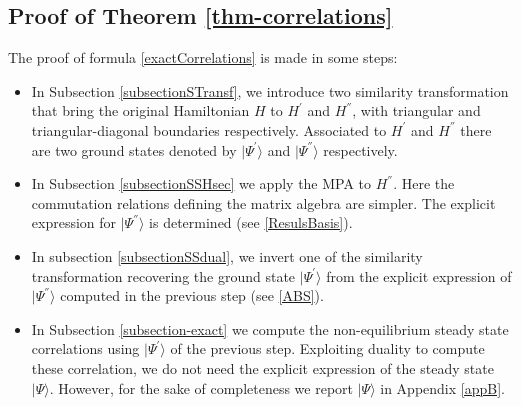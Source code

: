 \documentclass[10pt]{article}
\numberwithin{equation}{section}
\numberwithin{equation}{subsection}
\begin{document}
\subsection{Proof of Theorem \ref{thm-correlations}}
The proof of formula \eqref{exactCorrelations} is made in some steps:
\begin{itemize}
	\item In Subsection \ref{subsectionSTransf}, we introduce two similarity transformation that bring the original Hamiltonian $H$ to $H^{'}$ and $H^{''}$, with triangular and triangular-diagonal boundaries respectively. Associated to $H^{'}$ and $H^{''}$ there are two ground states denoted by $|\Psi^{'}\rangle$ and $|\Psi^{''}\rangle$ respectively. 
	\item In Subsection \ref{subsectionSSHsec} we apply the MPA to $H^{''}$. Here the commutation relations defining the matrix algebra are simpler. The explicit expression for $|\Psi^{''}\rangle$ is determined (see \eqref{ResulsBasis}).
	\item In subsection \ref{subsectionSSdual}, we invert one of the similarity transformation recovering the ground state $|\Psi^{'}\rangle$ from the explicit expression of $|\Psi^{''}\rangle$ computed in the previous step (see \eqref{ABS}).
	\item In Subsection \ref{subsection-exact} we compute the non-equilibrium steady state correlations using $|\Psi^{'}\rangle$ of the previous step. Exploiting duality to compute these correlation, we do not need the explicit expression of the steady state $|\Psi\rangle$. However, for the sake of completeness we report $|\Psi\rangle$ in Appendix \ref{appB}. 
\end{itemize}
\end{document}

